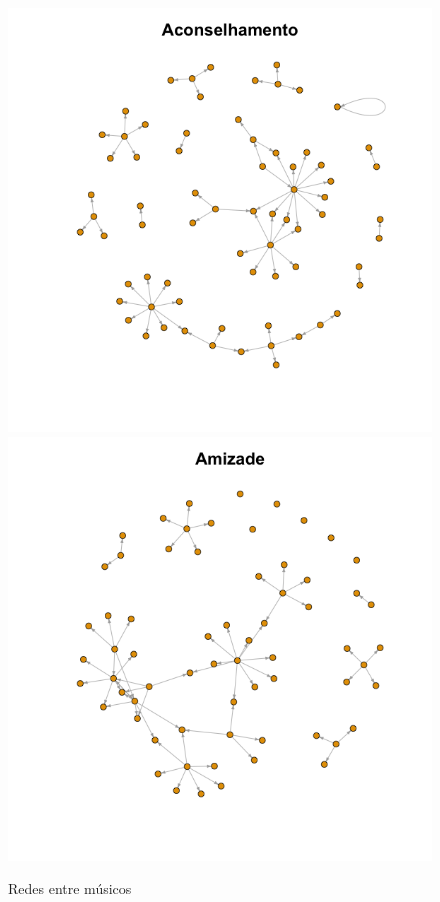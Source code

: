 \documentclass[a4paper, 12pt, openright, oneside, german, french, english, brazil]{abntex2}
\begin{document}
	\begin{figure}[!ht]
		\centering
		\caption{Redes entre músicos}
		\label{redes-entre-musicos}
		\includegraphics[scale=.35]{rede_conselho.png}
		\includegraphics[scale=.35]{rede_amizade.png}

\end{figure}
\end{document}
